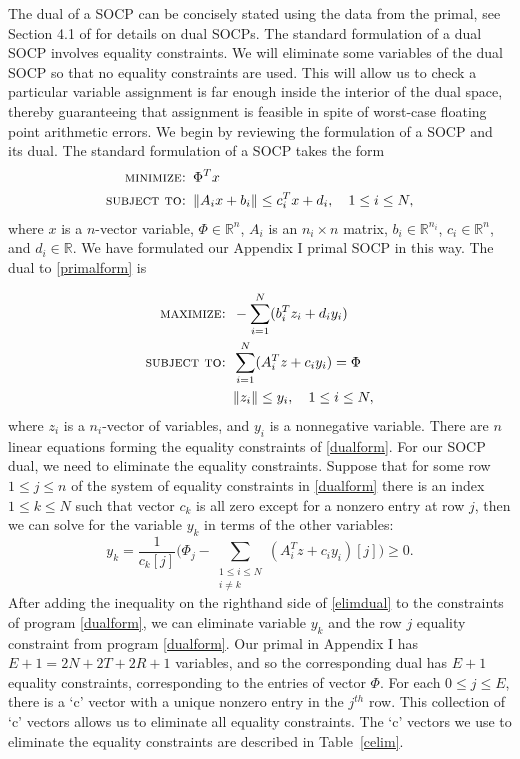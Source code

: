 \documentclass[12pt]{article}
\numberwithin{equation}{section}
\begin{document}
The dual of a SOCP can be concisely stated using the data from the primal, see Section 4.1 of \cite{LO} for details on dual SOCPs. The standard formulation of a dual SOCP involves equality constraints. We will eliminate some variables of the dual SOCP so that no equality constraints are used. This will allow us to check a particular variable assignment is far enough inside the interior of the dual space, thereby guaranteeing that assignment is feasible in spite of worst-case floating point arithmetic errors. We begin by reviewing the formulation of a SOCP and its dual. The standard formulation of a SOCP takes the form 
\begin{align}\label{primalform}
\textsc{minimize: } &\Phi^Tx  \nonumber \\
\textsc{subject to: } &\| A_ix + b_i \|  \leq c_i^Tx+d_i, \quad 1 \leq i \leq N ,
\end{align}
where $x$ is a $n$-vector variable, $\Phi \in \mathbb{R}^n$, $A_i$ is an $n_i \times n$ matrix, $b_i \in \mathbb{R}^{n_i}$, $c_i \in \mathbb{R}^n$, and $d_i \in \mathbb{R}$. We have formulated our Appendix I primal SOCP in this way. The dual to \eqref{primalform} is 


\begin{align}\label{dualform}
\textsc{maximize: } &- \sum_{i=1}^N(b_i^Tz_i + d_iy_i)  \nonumber \\
\textsc{subject to: } & \sum_{i=1}^N (A_i^Tz +c_iy_i) = \Phi \nonumber \\
&\| z_i \| \leq y_i, \quad 1 \leq i \leq N ,
\end{align}
where $z_i$ is a $n_i$-vector of variables, and $y_i$ is a nonnegative variable. There are $n$ linear equations forming the equality constraints of \eqref{dualform}. For our SOCP dual, we need to eliminate the equality constraints. Suppose that for some row $1 \leq j \leq n$ of the system of equality constraints in \eqref{dualform} there is an index $1 \leq k \leq N$ such that vector $c_k$ is all zero except for a nonzero entry at row $j$, then we can solve for the variable $y_k$ in terms of the other variables: 
\begin{equation}\label{elimdual} y_k= \frac{1}{c_k[j]} \big(\Phi_j - \sum_{\substack{1 \leq i \leq N \\ i \neq k }} (A^T_iz + c_iy_i )[j]\big) \geq 0.\end{equation}
After adding the inequality on the righthand side of \eqref{elimdual} to the constraints of program \eqref{dualform}, we can eliminate variable $y_k$ and the row $j$ equality constraint from program \eqref{dualform}. Our primal in Appendix I has $E+1 = 2N + 2T + 2R + 1$ variables, and so the corresponding dual has $E+1$ equality constraints, corresponding to the entries of vector $\Phi$. For each $0 \leq j \leq E$, there is a `c' vector with a unique nonzero entry in the $j^{th}$ row. This collection of `c' vectors allows us to eliminate all equality constraints. The `c' vectors we use to eliminate the equality constraints are described in Table~\ref{celim}.
\end{document}
